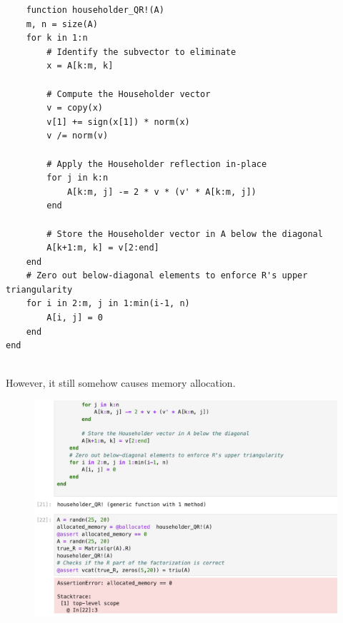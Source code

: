 \documentclass{article}
\begin{document}
\begin{verbatim}
    function householder_QR!(A)
    m, n = size(A)
    for k in 1:n
        # Identify the subvector to eliminate
        x = A[k:m, k]
        
        # Compute the Householder vector
        v = copy(x)
        v[1] += sign(x[1]) * norm(x)
        v /= norm(v)
        
        # Apply the Householder reflection in-place
        for j in k:n
            A[k:m, j] -= 2 * v * (v' * A[k:m, j])
        end
        
        # Store the Householder vector in A below the diagonal
        A[k+1:m, k] = v[2:end]
    end
    # Zero out below-diagonal elements to enforce R's upper triangularity
    for i in 2:m, j in 1:min(i-1, n)
        A[i, j] = 0
    end
end


\end{verbatim}
However, it still somehow causes memory allocation.
\begin{figure}[H]
    \centering
    \includegraphics[width=0.75\linewidth]{Image 3-5-24 at 01.09.jpeg}
\end{figure}
\end{document}

